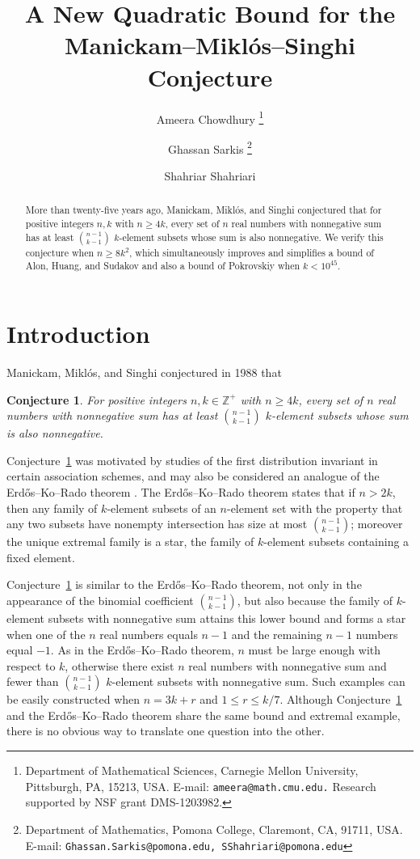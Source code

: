 \documentclass[12pt]{article}
\title{A New Quadratic Bound for the Manickam--Mikl\'{o}s--Singhi Conjecture}
\author{Ameera Chowdhury \thanks{Department of Mathematical Sciences, Carnegie Mellon University, Pittsburgh, PA, 15213, USA. E-mail: {\tt ameera@math.cmu.edu.} Research supported by NSF grant DMS-1203982.} \and Ghassan Sarkis \thanks{Department of Mathematics, Pomona College, Claremont, CA, 91711, USA. E-mail: {\tt Ghassan.Sarkis@pomona.edu, SShahriari@pomona.edu}} \and Shahriar Shahriari \footnotemark[2]}
\theoremstyle{plain}
{\theorembodyfont{\slshape}
\newtheorem{theorem}{Theorem}[section]
\newtheorem{lemma}[theorem]{Lemma}
\newtheorem{corollary}[theorem]{Corollary}}
\newtheorem{conjecture}[theorem]{Conjecture}
\newcommand\conjref[1]{Conjecture~\ref{conj:#1}}
\begin{document}
\maketitle

\begin{abstract}
More than twenty-five years ago, Manickam, Mikl\'{o}s, and Singhi conjectured that for positive integers $n,k$ with $n \geq 4k$, every set of $n$ real numbers with nonnegative sum has at least $\binom{n-1}{k-1}$ $k$-element subsets whose sum is also nonnegative. We verify this conjecture when $n \geq 8k^{2}$, which simultaneously improves and simplifies a bound of Alon, Huang, and Sudakov and also a bound of Pokrovskiy when $k < 10^{45}$.
\end{abstract}

\section{Introduction}
\label{sec:intro}

Manickam, Mikl\'{o}s, and Singhi \cite{mm, ms} conjectured in 1988 that
\begin{conjecture}
\label{conj:MMS}
For positive integers $n,k \in \mathbb{Z}^{+}$ with $n \geq 4k$, every set of $n$ real numbers with nonnegative sum has at least $\binom{n-1}{k-1}$ $k$-element subsets whose sum is also nonnegative.
\end{conjecture}
\conjref{MMS} was motivated by studies of the first distribution invariant in certain association schemes, and may also be considered an analogue of the Erd\H{o}s--Ko--Rado theorem \cite{ekr}. The Erd\H{o}s--Ko--Rado theorem states that if $n > 2k$, then any family of $k$-element subsets of an $n$-element set with the property that any two subsets have nonempty intersection has size at most $\binom{n-1}{k-1}$; moreover the unique extremal family is a star, the family of $k$-element subsets containing a fixed element.

\conjref{MMS} is similar to the Erd\H{o}s--Ko--Rado theorem, not only in the appearance of the binomial coefficient $\binom{n-1}{k-1}$, but also because the family of $k$-element subsets with nonnegative sum attains this lower bound and forms a star when one of the $n$ real numbers equals $n-1$ and the remaining $n-1$ numbers equal $-1$. As in the Erd\H{o}s--Ko--Rado theorem, $n$ must be large enough with respect to $k$, otherwise there exist $n$ real numbers with nonnegative sum and fewer than $\binom{n-1}{k-1}$ $k$-element subsets with nonnegative sum. Such examples can be easily constructed when $n=3k+r$ and $1 \leq r \leq k/7$. Although \conjref{MMS} and the Erd\H{o}s--Ko--Rado theorem share the same bound and extremal example, there is no obvious way to translate one question into the other.
\end{document}
